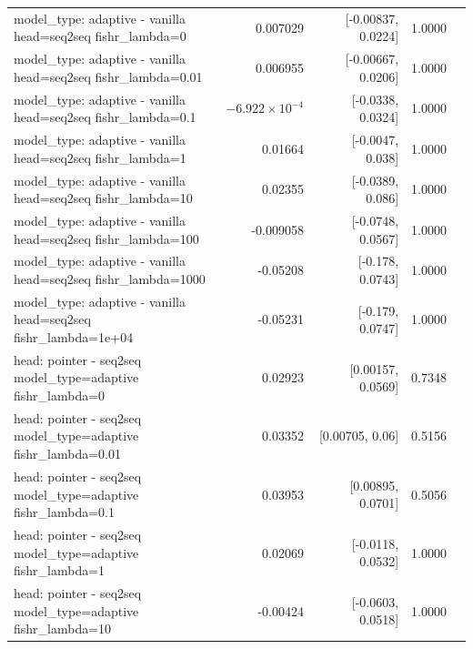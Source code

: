 \documentclass[10pt]{article}
\makeatletter
\newcommand{\stackcell}[1]{\begin{tabular}[t]{@{}l@{}}#1\end{tabular}}
\makeatother
\begin{document}
{\begin{longtable}{lrrrl}
\stackcell{model\_type: adaptive - vanilla\\\footnotesize head=seq2seq fishr\_lambda=0 } & 0.007029 & [-0.00837, 0.0224] & 1.0000 & \\
\stackcell{model\_type: adaptive - vanilla\\\footnotesize head=seq2seq fishr\_lambda=0.01 } & 0.006955 & [-0.00667, 0.0206] & 1.0000 & \\
\stackcell{model\_type: adaptive - vanilla\\\footnotesize head=seq2seq fishr\_lambda=0.1 } & $-6.922\times10^{-4}$ & [-0.0338, 0.0324] & 1.0000 & \\
\stackcell{model\_type: adaptive - vanilla\\\footnotesize head=seq2seq fishr\_lambda=1 } & 0.01664 & [-0.0047, 0.038] & 1.0000 & \\
\stackcell{model\_type: adaptive - vanilla\\\footnotesize head=seq2seq fishr\_lambda=10 } & 0.02355 & [-0.0389, 0.086] & 1.0000 & \\
\stackcell{model\_type: adaptive - vanilla\\\footnotesize head=seq2seq fishr\_lambda=100 } & -0.009058 & [-0.0748, 0.0567] & 1.0000 & \\
\stackcell{model\_type: adaptive - vanilla\\\footnotesize head=seq2seq fishr\_lambda=1000 } & -0.05208 & [-0.178, 0.0743] & 1.0000 & \\
\stackcell{model\_type: adaptive - vanilla\\\footnotesize head=seq2seq fishr\_lambda=1e+04 } & -0.05231 & [-0.179, 0.0747] & 1.0000 & \\
\stackcell{head: pointer - seq2seq\\\footnotesize model\_type=adaptive fishr\_lambda=0 } & 0.02923 & [0.00157, 0.0569] & 0.7348 & \\
\stackcell{head: pointer - seq2seq\\\footnotesize model\_type=adaptive fishr\_lambda=0.01 } & 0.03352 & [0.00705, 0.06] & 0.5156 & \\
\stackcell{head: pointer - seq2seq\\\footnotesize model\_type=adaptive fishr\_lambda=0.1 } & 0.03953 & [0.00895, 0.0701] & 0.5056 & \\
\stackcell{head: pointer - seq2seq\\\footnotesize model\_type=adaptive fishr\_lambda=1 } & 0.02069 & [-0.0118, 0.0532] & 1.0000 & \\
\stackcell{head: pointer - seq2seq\\\footnotesize model\_type=adaptive fishr\_lambda=10 } & -0.00424 & [-0.0603, 0.0518] & 1.0000 & \\

\end{longtable}}
\end{document}
